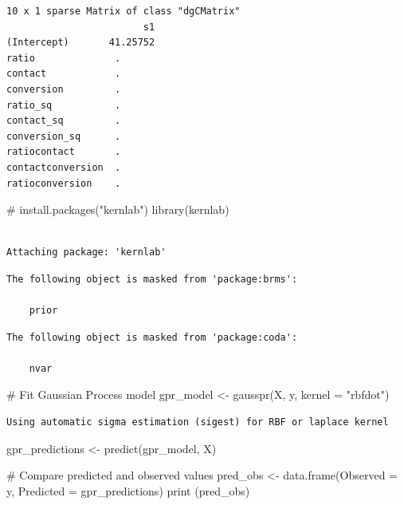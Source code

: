 \documentclass[
  10pt,
]{article}
\newenvironment{Shaded}{\begin{snugshade}}{\end{snugshade}}
\newcommand{\AttributeTok}[1]{\textcolor[rgb]{0.40,0.45,0.13}{#1}}
\newcommand{\CommentTok}[1]{\textcolor[rgb]{0.37,0.37,0.37}{#1}}
\newcommand{\FunctionTok}[1]{\textcolor[rgb]{0.28,0.35,0.67}{#1}}
\newcommand{\NormalTok}[1]{\textcolor[rgb]{0.00,0.23,0.31}{#1}}
\newcommand{\OtherTok}[1]{\textcolor[rgb]{0.00,0.23,0.31}{#1}}
\newcommand{\StringTok}[1]{\textcolor[rgb]{0.13,0.47,0.30}{#1}}
\begin{document}
\begin{verbatim}
10 x 1 sparse Matrix of class "dgCMatrix"
                        s1
(Intercept)       41.25752
ratio              .      
contact            .      
conversion         .      
ratio_sq           .      
contact_sq         .      
conversion_sq      .      
ratiocontact       .      
contactconversion  .      
ratioconversion    .      
\end{verbatim}

\begin{Shaded}
\begin{Highlighting}[]
\CommentTok{\# install.packages("kernlab")}
\FunctionTok{library}\NormalTok{(kernlab)}
\end{Highlighting}
\end{Shaded}

\begin{verbatim}

Attaching package: 'kernlab'
\end{verbatim}

\begin{verbatim}
The following object is masked from 'package:brms':

    prior
\end{verbatim}

\begin{verbatim}
The following object is masked from 'package:coda':

    nvar
\end{verbatim}

\begin{Shaded}
\begin{Highlighting}[]
\CommentTok{\# Fit Gaussian Process model}
\NormalTok{gpr\_model }\OtherTok{\textless{}{-}} \FunctionTok{gausspr}\NormalTok{(X, y, }\AttributeTok{kernel =} \StringTok{"rbfdot"}\NormalTok{)}
\end{Highlighting}
\end{Shaded}

\begin{verbatim}
Using automatic sigma estimation (sigest) for RBF or laplace kernel 
\end{verbatim}

\begin{Shaded}
\begin{Highlighting}[]
\NormalTok{gpr\_predictions }\OtherTok{\textless{}{-}} \FunctionTok{predict}\NormalTok{(gpr\_model, X)}

\CommentTok{\# Compare predicted and observed values}
\NormalTok{pred\_obs }\OtherTok{\textless{}{-}} \FunctionTok{data.frame}\NormalTok{(}\AttributeTok{Observed =}\NormalTok{ y, }\AttributeTok{Predicted =}\NormalTok{ gpr\_predictions)}
\FunctionTok{print}\NormalTok{ (pred\_obs)}
\end{Highlighting}
\end{Shaded}
\end{document}

